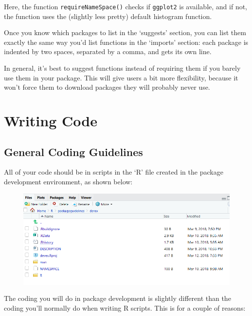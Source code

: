 \documentclass[]{book}
\begin{document}
Here, the function \texttt{requireNameSpace()} checks if
\texttt{ggplot2} is available, and if not, the function uses the
(slightly less pretty) default histogram function.

Once you know which packages to list in the `suggests' section, you can
list them exactly the same way you'd list functions in the `imports'
section: each package is indented by two spaces, separated by a comma,
and gets its own line.

In general, it's best to suggest functions instead of requiring them if
you barely use them in your package. This will give users a bit more
flexibility, because it won't force them to download packages they will
probably never use.

\section{Writing Code}\label{writing-code}

\subsection{General Coding Guidelines}\label{general-coding-guidelines}

All of your code should be in scripts in the `R' file created in the
package development environment, as shown below:

\begin{figure}
\centering
\includegraphics{images/packageSS/code1.PNG}
\caption{}
\end{figure}

The coding you will do in package development is slightly different than
the coding you'll normally do when writing R scripts. This is for a
couple of reasons:
\end{document}

